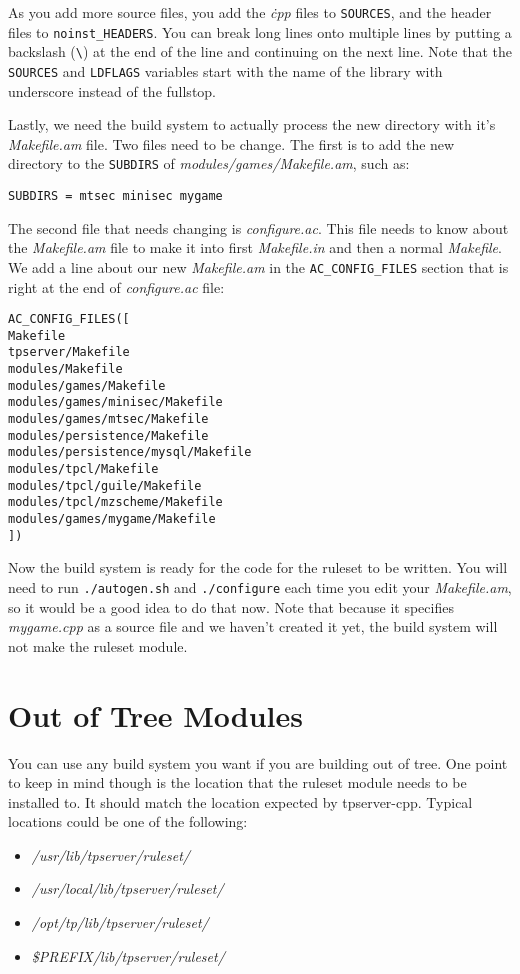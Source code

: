 \documentclass[a4paper,11pt]{report}
\newcommand{\filename}[1]{\emph{#1}}
\newcommand{\codename}[1]{\texttt{#1}}
\begin{document}
As you add more source files, you add the \filename{\.cpp} files to \codename{SOURCES}, and the header files to \codename{noinst\_HEADERS}. You can break long lines onto multiple lines by putting a backslash (\verb|\|) at the end of the line and continuing on the next line. Note that the \codename{SOURCES} and \codename{LDFLAGS} variables start with the name of the library with underscore instead of the fullstop.

Lastly, we need the build system to actually process the new directory with it's \filename{Makefile.am} file. Two files need to be change. The first is to add the new directory to the \codename{SUBDIRS} of \filename{modules/games/Makefile.am}, such as:

\begin{verbatim}
SUBDIRS = mtsec minisec mygame
\end{verbatim}

The second file that needs changing is \filename{configure.ac}. This file needs to know about the \filename{Makefile.am} file to make it into first \filename{Makefile.in} and then a normal \filename{Makefile}. We add a line about our new \filename{Makefile.am} in the \codename{AC\_CONFIG\_FILES} section that is right at the end of \filename{configure.ac} file:

\begin{verbatim}
AC_CONFIG_FILES([
Makefile
tpserver/Makefile
modules/Makefile
modules/games/Makefile
modules/games/minisec/Makefile
modules/games/mtsec/Makefile
modules/persistence/Makefile
modules/persistence/mysql/Makefile
modules/tpcl/Makefile
modules/tpcl/guile/Makefile
modules/tpcl/mzscheme/Makefile
modules/games/mygame/Makefile
]) 
\end{verbatim}

Now the build system is ready for the code for the ruleset to be written. You will need to run \codename{./autogen.sh} and \codename{./configure} each time you edit your \filename{Makefile.am}, so it would be a good idea to do that now. Note that because it specifies \filename{mygame.cpp} as a source file and we haven't created it yet, the build system will not make the ruleset module.

\section{Out of Tree Modules}
\label{sec:outoftree-module-build}

You can use any build system you want if you are building out of tree. One point to keep in mind though is the location that the ruleset module needs to be installed to. It should match the location expected by tpserver-cpp. Typical locations could be one of the following:
\begin{itemize}
 \item \filename{/usr/lib/tpserver/ruleset/}
 \item \filename{/usr/local/lib/tpserver/ruleset/}
 \item \filename{/opt/tp/lib/tpserver/ruleset/}
 \item \filename{\$PREFIX/lib/tpserver/ruleset/}
\end{itemize}
\end{document}
